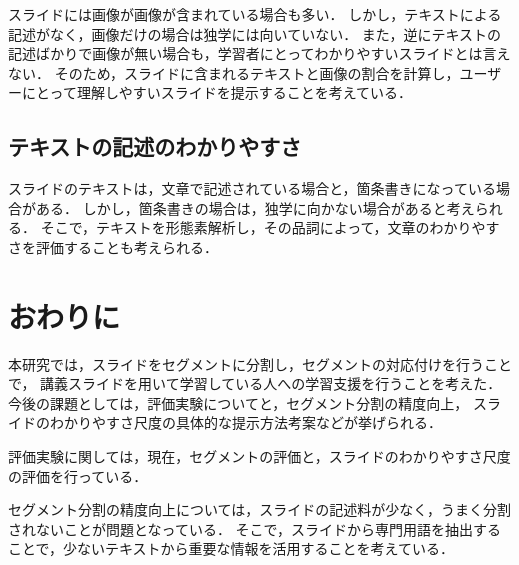 \documentclass{js}
\begin{document}
スライドには画像が画像が含まれている場合も多い．
しかし，テキストによる記述がなく，画像だけの場合は独学には向いていない．
また，逆にテキストの記述ばかりで画像が無い場合も，学習者にとってわかりやすいスライドとは言えない．
そのため，スライドに含まれるテキストと画像の割合を計算し，ユーザーにとって理解しやすいスライドを提示することを考えている．


\subsection{テキストの記述のわかりやすさ}

スライドのテキストは，文章で記述されている場合と，箇条書きになっている場合がある．
しかし，箇条書きの場合は，独学に向かない場合があると考えられる．
そこで，テキストを形態素解析し，その品詞によって，文章のわかりやすさを評価することも考えられる．





\section{おわりに}

本研究では，スライドをセグメントに分割し，セグメントの対応付けを行うことで，
講義スライドを用いて学習している人への学習支援を行うことを考えた．
今後の課題としては，評価実験についてと，セグメント分割の精度向上，
スライドのわかりやすさ尺度の具体的な提示方法考案などが挙げられる．

評価実験に関しては，現在，セグメントの評価と，スライドのわかりやすさ尺度の評価を行っている．

セグメント分割の精度向上については，スライドの記述料が少なく，うまく分割されないことが問題となっている．
そこで，スライドから専門用語を抽出することで，少ないテキストから重要な情報を活用することを考えている．










\end{document}
